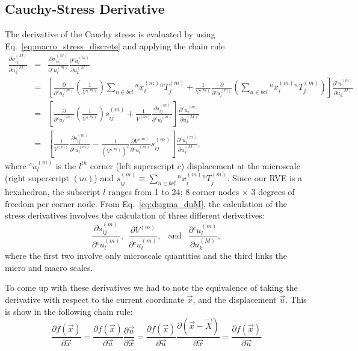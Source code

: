 \subsection{Cauchy-Stress Derivative}
%
The derivative of the Cauchy stress is evaluated by using Eq.\ \eqref{eq:macro_stress_discrete} and applying the chain rule 
%
\begin{eqnarray}
\frac{\partial \sigma_{ij}^{(M)}}{\partial  u^{(M)}_k}  &=& \frac{\partial \sigma_{ij}^{(M)}}{\partial {}^c u_l^{(m)}} \frac{\partial {}^c u_l^{(m)}}{\partial u^{(M)}_k} \nonumber\\
%
&=& \left [ \frac{\partial}{\partial {}^c u^{(m)}_l}  \left(\frac{1}{V^{(m)}}\right) \sum_{n \in bcl} {}^nx_i^{(m)} {}^nT_j^{(m)}+ \frac{1}{V^{(m)}} \frac{\partial}{\partial {}^c u^{(m)}_l} \left(\sum_{n \in bcl} {}^nx_i^{(m)} {}^nT_j^{(m)} \right) \right] \frac{\partial {}^c u_l^{{(m)}}}{\partial u^{(M)}_k} \nonumber\\
%
&=&  \left[\frac{\partial}{\partial {}^c u^{(m)}_l}  \left(\frac{1}{V^{(m)}} \right)s_{ij}^{(m)} + \frac{1}{V^{(m)}} \frac{\partial s_{ij}^{(m)}}{\partial {}^c u^{(m)}_l}\right] \frac{\partial {}^c u_l^{{(m)}}}{\partial u^{(M)}_k} \nonumber\\
%
&=& \left[\frac{1}{V^{(m)}} \frac{\partial s_{ij}^{(m)}}{\partial {}^c u^{(m)}_l} -\frac{1}{(V^{(m)})^2}\frac{\partial V^{(m)}}{\partial {}^c u^{(m)}_l}s_{ij}^{(m)} \right] \frac{\partial {}^c u_l^{{(m)}}}{\partial u^{(M)}_k},
\label{eq:dsigma_duM}
\end{eqnarray}
%
where ${}^c u_l^{{(m)}}$ is the $l^{th}$ corner (left superscript $c$) displacement at the microscale (right superscript $(m)$) and $s_{ij}^{(m)} \equiv \sum_{n \in bcl} {}^n x^{(m)}_i {}^nT^{(m)}_j$. Since our RVE is a hexahedron, the subscript $l$ ranges from 1 to 24; 8 corner nodes $\times$ 3 degrees of freedom per corner node.  From Eq.\ \eqref{eq:dsigma_duM}, the calculation of the stress derivatives involves the calculation of three different derivatives:
%
\begin{equation}
\frac{\partial s_{ij}^{(m)}}{\partial {}^cu_l^{{(m)}} }, \ \
\frac{\partial V^{(m)}}{\partial {}^c u_l^{{(m)}}}, \ \ \text{ and } \ \ 
\frac{\partial {}^c u_l^{{(m)}}}{\partial u^{(M)}_k},
\end{equation}
%
where the first two involve only microscale quantities and the third links the micro and macro scales.

To come up with these derivatives we had to note the equivalence of taking the derivative with respect to the current coordinate \(\vec{x}\), and the displacement \(\vec{u}\). This is show in the following chain rule:
\begin{equation}
\frac{\partial f(\vec{x})}{\partial\vec{x}} = \frac{\partial f(\vec{x})}{\partial\vec{u}}\frac{\partial \vec{u}}{\partial\vec{x}} = \frac{\partial f(\vec{x})}{\partial \vec{u}}\frac{\partial (\vec{x}-\vec{X})}{\partial\vec{x}}=\frac{\partial f(\vec{x})}{\partial \vec{u}}
\end{equation}

